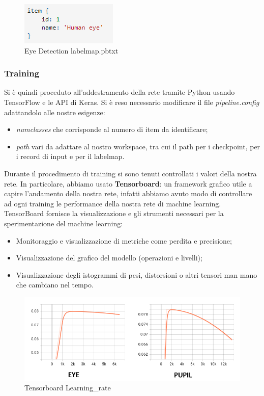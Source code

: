\documentclass[11pt]{article}
\begin{document}
\begin{figure}[h]
\caption{Eye Detection labelmap.pbtxt}
\centering
\includegraphics[scale=1]{img/item.png}
\end{figure}


\subsubsection{Training}
Si è quindi proceduto all’addestramento della rete tramite Python usando TensorFlow e le API di Keras. Si è reso necessario modificare il file \textit{pipeline.config} adattandolo alle nostre esigenze: 
\begin{itemize}
    \item \textit{numclasses} che corrisponde al numero di item da identificare;
    \item \textit{path} vari da adattare al nostro workspace, tra cui il path per i checkpoint, per i record di input e per il labelmap.
\end{itemize}
\newline
Durante il procedimento di training si sono tenuti controllati i valori della nostra rete. In particolare, abbiamo usato \textbf{Tensorboard}: un framework grafico utile a capire l'andamento della nostra rete, infatti abbiamo avuto modo di controllare ad ogni training le performance della nostra rete di machine learning.
\newline
TensorBoard fornisce la visualizzazione e gli strumenti necessari per la sperimentazione del machine learning:
\begin{itemize}
    \item Monitoraggio e visualizzazione di metriche come perdita e precisione;
    \item Visualizzazione del grafico del modello (operazioni e livelli);
    \item Visualizzazione degli istogrammi di pesi, distorsioni o altri tensori man mano che cambiano nel tempo.
\end{itemize}


\begin{figure}[h]
\caption{Tensorboard Learning\_rate}
\centering
\includegraphics[scale=0.7]{img/learning_rate_both_edited.png}
\end{figure}
\end{document}
